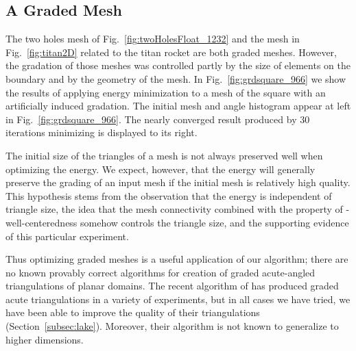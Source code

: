 \documentclass[final]{siamltex}
\begin{document}
\subsection{A Graded Mesh}
The two holes mesh of Fig.~\ref{fig:twoHolesFloat_1232} and the mesh
in Fig.~\ref{fig:titan2D} related to the titan rocket are both graded
meshes. However, the gradation of those meshes was controlled partly
by the size of elements on the boundary and by the geometry of the
mesh. In Fig.~\ref{fig:grdsquare_966} we show the results of applying
energy minimization to a mesh of the square with an artificially
induced gradation. The initial mesh and angle histogram appear at left
in Fig.~\ref{fig:grdsquare_966}.  The nearly converged result produced
by 30 iterations minimizing  is displayed to its right. 

The initial size of the triangles of a mesh is not always preserved
well when optimizing the energy.  We expect, however, that
the energy will generally preserve the
grading of an input mesh if the initial mesh is
relatively high quality.  This hypothesis stems from the observation
that the energy is independent of triangle size, the idea that the
mesh connectivity combined with the property of -well-centeredness
somehow controls the triangle size, and the supporting evidence of
this particular experiment. 

Thus optimizing graded meshes is a useful application of our
algorithm;  there are no known provably correct
algorithms for creation of graded acute-angled
triangulations of planar domains.  The recent algorithm of
\cite{ErUn2007} has produced graded acute triangulations in a
variety of experiments, but in all cases we have tried, we have
been able to improve the quality of
their triangulations (Section~\ref{subsec:lake}).  Moreover, their
algorithm is not known to generalize to higher dimensions.
\end{document}

